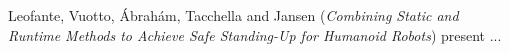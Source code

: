 

Leofante, Vuotto, \'{A}brah\'{a}m, Tacchella and Jansen
\cite{isola-2016-leofante}
({\em Combining Static and Runtime Methods to Achieve 
      Safe Standing-Up for Humanoid Robots})
present ...

